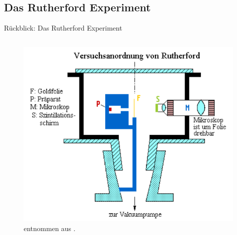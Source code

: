 \documentclass[aspectratio=1610, 9pt]{beamer}
\begin{document}
\subsection{Das Rutherford Experiment}
\begin{frame}{Rückblick: Das Rutherford Experiment}
  \begin{columns}
    \begin{column}{0.4\textwidth}
      \begin{figure}
        \includegraphics[width=\textwidth]{images/Rutherford1.png}
        \caption{entnommen aus \cite{leifi}.}
      \end{figure}


\end{column}
\end{columns}
\end{frame}
\end{document}
